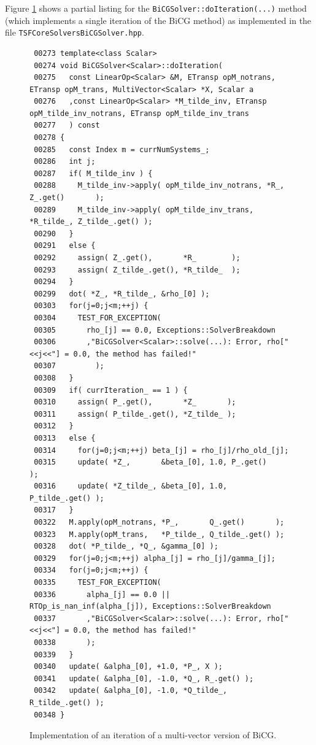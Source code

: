 Figure \ref{tsfcore:fig:BiCG_code} shows a partial listing for the
\texttt{BiCGSolver\-::doIteration(...)} method (which implements
a single iteration of the BiCG method) as implemented in the file
\texttt{TSFCore\-Solvers\-BiCG\-Solver.hpp}.
%
{\bsinglespace
\begin{figure}
\begin{minipage}{\textwidth}
{\scriptsize\begin{verbatim}
 00273 template<class Scalar>
 00274 void BiCGSolver<Scalar>::doIteration(
 00275   const LinearOp<Scalar> &M, ETransp opM_notrans, ETransp opM_trans, MultiVector<Scalar> *X, Scalar a
 00276   ,const LinearOp<Scalar> *M_tilde_inv, ETransp opM_tilde_inv_notrans, ETransp opM_tilde_inv_trans
 00277   ) const
 00278 {
 00285   const Index m = currNumSystems_;
 00286   int j;
 00287   if( M_tilde_inv ) {
 00288     M_tilde_inv->apply( opM_tilde_inv_notrans, *R_,       Z_.get()       );
 00289     M_tilde_inv->apply( opM_tilde_inv_trans,   *R_tilde_, Z_tilde_.get() );
 00290   }
 00291   else {
 00292     assign( Z_.get(),       *R_        );
 00293     assign( Z_tilde_.get(), *R_tilde_  );
 00294   }
 00299   dot( *Z_, *R_tilde_, &rho_[0] );
 00303   for(j=0;j<m;++j) {
 00304     TEST_FOR_EXCEPTION(
 00305       rho_[j] == 0.0, Exceptions::SolverBreakdown
 00306       ,"BiCGSolver<Scalar>::solve(...): Error, rho["<<j<<"] = 0.0, the method has failed!"
 00307         );
 00308   }
 00309   if( currIteration_ == 1 ) {
 00310     assign( P_.get(),       *Z_       );
 00311     assign( P_tilde_.get(), *Z_tilde_ );
 00312   }
 00313   else {
 00314     for(j=0;j<m;++j) beta_[j] = rho_[j]/rho_old_[j];
 00315     update( *Z_,       &beta_[0], 1.0, P_.get()       );
 00316     update( *Z_tilde_, &beta_[0], 1.0, P_tilde_.get() );
 00317   }
 00322   M.apply(opM_notrans, *P_,       Q_.get()       );
 00323   M.apply(opM_trans,   *P_tilde_, Q_tilde_.get() );
 00328   dot( *P_tilde_, *Q_, &gamma_[0] );
 00329   for(j=0;j<m;++j) alpha_[j] = rho_[j]/gamma_[j];
 00334   for(j=0;j<m;++j) {
 00335     TEST_FOR_EXCEPTION(
 00336       alpha_[j] == 0.0 || RTOp_is_nan_inf(alpha_[j]), Exceptions::SolverBreakdown
 00337       ,"BiCGSolver<Scalar>::solve(...): Error, rho["<<j<<"] = 0.0, the method has failed!"
 00338       );
 00339   }
 00340   update( &alpha_[0], +1.0, *P_, X );
 00341   update( &alpha_[0], -1.0, *Q_, R_.get() );
 00342   update( &alpha_[0], -1.0, *Q_tilde_, R_tilde_.get() );
 00348 }
\end{verbatim}}
\end{minipage}
\caption{
\label{tsfcore:fig:BiCG_code}
Implementation of an iteration of a multi-vector version of BiCG.
}
\end{figure}
\esinglespace}
